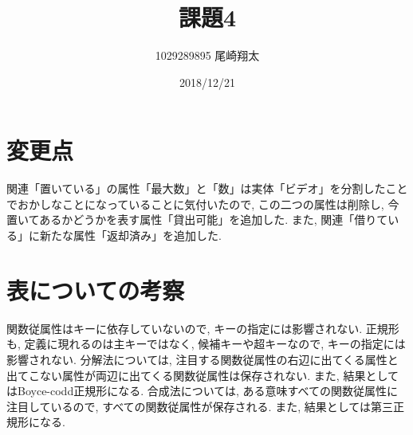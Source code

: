 \documentclass{jarticle}
\begin{document}
\title{課題4}
\author{1029289895 尾崎翔太}
\date{2018/12/21}

\maketitle
\newpage

\section{変更点}
関連「置いている」の属性「最大数」と「数」は実体「ビデオ」を分割したことでおかしなことになっていることに気付いたので, この二つの属性は削除し, 今置いてあるかどうかを表す属性「貸出可能」を追加した. また, 関連「借りている」に新たな属性「返却済み」を追加した.

\section{表についての考察}
関数従属性はキーに依存していないので, キーの指定には影響されない. 正規形も, 定義に現れるのは主キーではなく, 候補キーや超キーなので, キーの指定には影響されない. 分解法については, 注目する関数従属性の右辺に出てくる属性と出てこない属性が両辺に出てくる関数従属性は保存されない. また, 結果としてはBoyce-codd正規形になる. 合成法については, ある意味すべての関数従属性に注目しているので, すべての関数従属性が保存される. また, 結果としては第三正規形になる.
\end{document}

